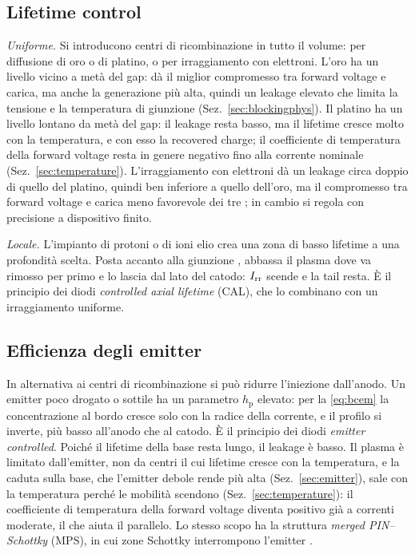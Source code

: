 \documentclass[10pt,a4paper]{scrartcl}
\let\newcommand\pdvaluedefine
\newcommand{\Irr}{I_\mathrm{rr}}
\newcommand{\Pp}{p\textsuperscript{+}}
\newcommand{\Nm}{n\textsuperscript{--}}
\begin{document}
\subsection{Lifetime control}
\label{sec:lifetimecontrol}
\emph{Uniforme.} Si introducono centri di ricombinazione in tutto il volume: per diffusione di oro o di platino, o per irraggiamento con elettroni. L'oro ha un livello vicino a metà del gap: dà il miglior compromesso tra forward voltage e carica, ma anche la generazione più alta, quindi un leakage elevato che limita la tensione e la temperatura di giunzione (Sez.~\ref{sec:blockingphys}). Il platino ha un livello lontano da metà del gap: il leakage resta basso, ma il lifetime cresce molto con la temperatura, e con esso la recovered charge; il coefficiente di temperatura della forward voltage resta in genere negativo fino alla corrente nominale (Sez.~\ref{sec:temperature}). L'irraggiamento con elettroni dà un leakage circa doppio di quello del platino, quindi ben inferiore a quello dell'oro, ma il compromesso tra forward voltage e carica meno favorevole dei tre \cite{baligasun1977}; in cambio si regola con precisione a dispositivo finito.

\emph{Locale.} L'impianto di protoni o di ioni elio crea una zona di basso lifetime a una profondità scelta. Posta accanto alla giunzione \Pp\Nm, abbassa il plasma dove va rimosso per primo e lo lascia dal lato del catodo: $\Irr$ scende e la tail resta. È il principio dei diodi \emph{controlled axial lifetime} (CAL), che lo combinano con un irraggiamento uniforme.

\subsection{Efficienza degli emitter}
\label{sec:emittereff}
In alternativa ai centri di ricombinazione si può ridurre l'iniezione dall'anodo. Un emitter \Pp{} poco drogato o sottile ha un parametro $h_\mathrm{p}$ elevato: per la \eqref{eq:bcem} la concentrazione al bordo \Pp\Nm{} cresce solo con la radice della corrente, e il profilo si inverte, più basso all'anodo che al catodo. È il principio dei diodi \emph{emitter controlled}. Poiché il lifetime della base resta lungo, il leakage è basso. Il plasma è limitato dall'emitter, non da centri il cui lifetime cresce con la temperatura, e la caduta sulla base, che l'emitter debole rende più alta (Sez.~\ref{sec:emitter}), sale con la temperatura perché le mobilità scendono (Sez.~\ref{sec:temperature}): il coefficiente di temperatura della forward voltage diventa positivo già a correnti moderate, il che aiuta il parallelo. Lo stesso scopo ha la struttura \emph{merged PIN--Schottky} (MPS), in cui zone Schottky interrompono l'emitter \Pp.
\end{document}
